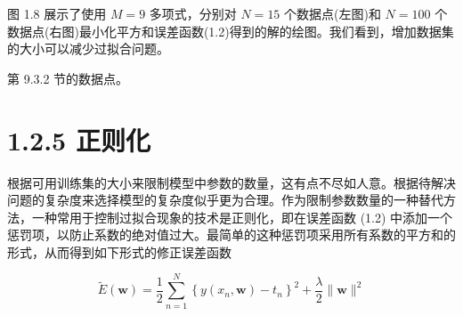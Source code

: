 \documentclass[10pt]{report}
\begin{document}
图 1.8 展示了使用 \(M = 9\) 多项式，分别对 \(N = {15}\) 个数据点(左图)和 \(N = {100}\) 个数据点(右图)最小化平方和误差函数(1.2)得到的解的绘图。我们看到，增加数据集的大小可以减少过拟合问题。

第 9.3.2 节的数据点。

\section*{1.2.5 正则化}

根据可用训练集的大小来限制模型中参数的数量，这有点不尽如人意。根据待解决问题的复杂度来选择模型的复杂度似乎更为合理。作为限制参数数量的一种替代方法，一种常用于控制过拟合现象的技术是正则化，即在误差函数 (1.2) 中添加一个惩罚项，以防止系数的绝对值过大。最简单的这种惩罚项采用所有系数的平方和的形式，从而得到如下形式的修正误差函数

\[
\widetilde{E}\left( \mathbf{w}\right)  = \frac{1}{2}\mathop{\sum }\limits_{{n = 1}}^{N}{\left\{  y\left( {x}_{n},\mathbf{w}\right)  - {t}_{n}\right\}  }^{2} + \frac{\lambda }{2}\parallel \mathbf{w}{\parallel }^{2} \tag{1.4}
\]

\begin{center}
\end{center}
\end{document}
